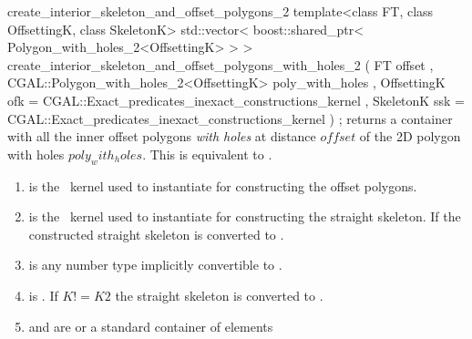 \begin{ccRefFunction}{create_interior_skeleton_and_offset_polygons_2}
\ccFunction
{template<class FT, class OffsettingK, class SkeletonK>
std::vector< boost::shared_ptr< Polygon_with_holes_2<OffsettingK> > >
create_interior_skeleton_and_offset_polygons_with_holes_2 
  ( FT offset
  , CGAL::Polygon_with_holes_2<OffsettingK> poly_with_holes
  , OffsettingK ofk = CGAL::Exact_predicates_inexact_constructions_kernel
  , SkeletonK ssk   = CGAL::Exact_predicates_inexact_constructions_kernel
  ) ;
}
{returns a container with all the inner offset polygons {\em with holes} at distance $offset$ of the 2D polygon with holes $poly_with_holes$.
This is equivalent to .}

\begin{enumerate}  
   \item    {} is the \cgal\ kernel used to instantiate
                             for constructing 
                            the offset polygons.
   \item    {} is the \cgal\ kernel used to instantiate
                             for constructing 
                            the straight skeleton.
                            If  the constructed straight skeleton
                            is converted to .
   \item    {} is any number type implicitly convertible to .
   \item    {} is . 
            If $K != K2$ the straight skeleton is converted to .
   \item    {} and  are 
            or a standard container of  elements 
\end{enumerate}

\ccSeeAlso
{}\\
 \\

\end{ccRefFunction}


